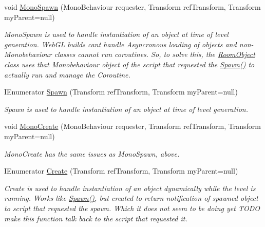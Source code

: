 \begin{DoxyCompactItemize}
\item 
void \hyperlink{class_room_object_ac2c70e62649bf5a716ac906160b1ad6b}{Mono\+Spawn} (Mono\+Behaviour requester, Transform ref\+Transform, Transform my\+Parent=null)
\begin{DoxyCompactList}\small\item\em Mono\+Spawn is used to handle instantiation of an object at time of level generation. Web\+GL builds can\textquotesingle{}t handle Asyncronous loading of objects and non-\/\+Monobehaviour classes cannot run coroutines. So, to solve this, the \hyperlink{class_room_object}{Room\+Object} class uses that Monobehaviour object of the script that requested the \hyperlink{class_room_object_a8a73cee299af481c4cd70501843e6005}{Spawn()} to actually run and manage the Coroutine. \end{DoxyCompactList}\item 
I\+Enumerator \hyperlink{class_room_object_a8a73cee299af481c4cd70501843e6005}{Spawn} (Transform ref\+Transform, Transform my\+Parent=null)
\begin{DoxyCompactList}\small\item\em Spawn is used to handle instantiation of an object at time of level generation. \end{DoxyCompactList}\item 
void \hyperlink{class_room_object_a495befc3f5df6b9281359b66db12cca5}{Mono\+Create} (Mono\+Behaviour requester, Transform ref\+Transform, Transform my\+Parent=null)
\begin{DoxyCompactList}\small\item\em Mono\+Create has the same issues as Mono\+Spawn, above. \end{DoxyCompactList}\item 
I\+Enumerator \hyperlink{class_room_object_a30b0d74a7687520afada4fcc75b149b8}{Create} (Transform ref\+Transform, Transform my\+Parent=null)
\begin{DoxyCompactList}\small\item\em Create is used to handle instantiation of an object dynamically while the level is running. Works like \hyperlink{class_room_object_a8a73cee299af481c4cd70501843e6005}{Spawn()}, but created to return notification of spawned object to script that requested the spawn. Which it does not seem to be doing yet T\+O\+DO make this function talk back to the script that requested it. \end{DoxyCompactList}\end{DoxyCompactItemize}
